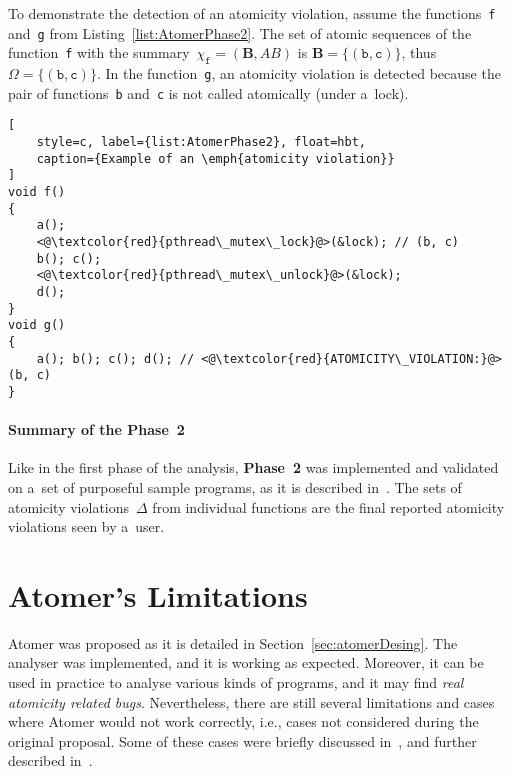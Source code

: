 \begin{example}
    To demonstrate the detection of an atomicity violation,
    assume the functions~\texttt{f} and~\texttt{g} from
    Listing~\ref{list:AtomerPhase2}. The set of atomic sequences
    of the function~\texttt{f} with the summary~$ \chi_\mathtt{f}
    = (\boldsymbol{B}, AB) $ is $ \boldsymbol{B} = {\{(\mathtt{b},
    \mathtt{c})\}} $, thus $ \Omega = {\{(\mathtt{b}, \mathtt{c})\}} $.
    In the function~\texttt{g}, an atomicity violation is detected
    because the pair of functions~\texttt{b} and~\texttt{c} is not
    called atomically (under a~lock).
\end{example}

\begin{lstlisting}[
    style=c, label={list:AtomerPhase2}, float=hbt,
    caption={Example of an \emph{atomicity violation}}
]
void f()
{
    a();
    <@\textcolor{red}{pthread\_mutex\_lock}@>(&lock); // (b, c)
    b(); c();
    <@\textcolor{red}{pthread\_mutex\_unlock}@>(&lock);
    d();
}
void g()
{
    a(); b(); c(); d(); // <@\textcolor{red}{ATOMICITY\_VIOLATION:}@> (b, c)
}
\end{lstlisting}

\paragraph{Summary of the Phase~2}

Like in the first phase of the analysis, \textbf{Phase~2} was implemented
and validated on a~set of purposeful sample programs, as it is described
in~\cite{harmimBP}. The sets of atomicity violations~$ \Delta $ from individual
functions are the final reported atomicity violations seen by a~user.


\section{Atomer's Limitations}
\label{sec:atomerLimits}

Atomer was proposed as it is detailed in Section~\ref{sec:atomerDesing}. The
analyser was implemented, and it is working as expected. Moreover, it can
be used in practice to analyse various kinds of programs, and it may find
\emph{real atomicity related bugs}. Nevertheless, there are still several
limitations and cases where Atomer would not work correctly, i.e., cases not
considered during the original proposal. Some of these cases were briefly
discussed in~\cite{harmimBP, excel2019FBInfer}, and further described
in~\cite{ppHarmim2020}.

